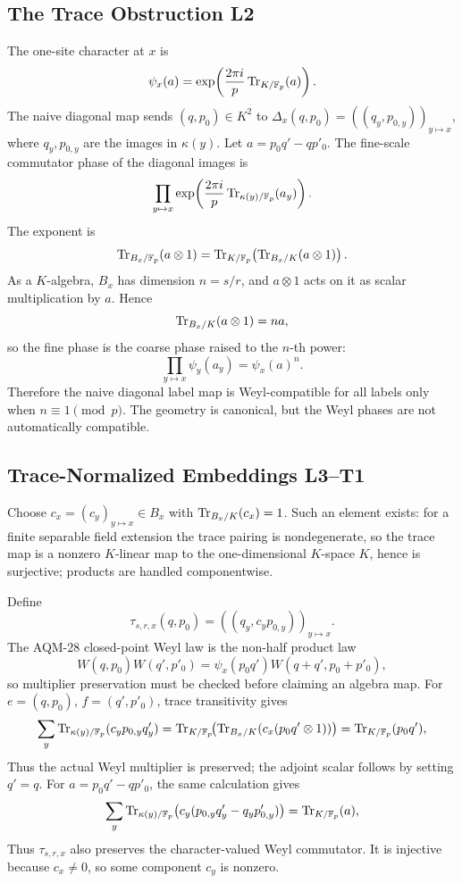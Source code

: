 \subsection{The Trace Obstruction L2}

The one-site character at \(x\) is
\[
  \psi_x(a)=\exp\!\left(\frac{2\pi i}{p}\operatorname{Tr}_{K/\mathbb F_p}(a)\right).
\]
The naive diagonal map sends \((q,p_0)\in K^2\) to
\(\Delta_x(q,p_0)=((q_y,p_{0,y}))_{y\mapsto x}\),
where \(q_y,p_{0,y}\) are the images in \(\kappa(y)\).  Let
\(a=p_0q'-q p'_0\).
The fine-scale commutator phase of the diagonal images is
\[
  \prod_{y\mapsto x}
  \exp\!\left(\frac{2\pi i}{p}
  \operatorname{Tr}_{\kappa(y)/\mathbb F_p}(a_y)\right).
\]
The exponent is
\[
  \operatorname{Tr}_{B_x/\mathbb F_p}(a\otimes1)
  =
  \operatorname{Tr}_{K/\mathbb F_p}\!\left(\operatorname{Tr}_{B_x/K}(a\otimes1)\right).
\]
As a \(K\)-algebra, \(B_x\) has dimension \(n=s/r\), and \(a\otimes1\) acts
on it as scalar multiplication by \(a\).  Hence
\[
  \operatorname{Tr}_{B_x/K}(a\otimes1)=n a,
\]
so the fine phase is the coarse phase raised to the \(n\)-th power:
\[
  \prod_{y\mapsto x}\psi_y(a_y)=\psi_x(a)^n .
\]
Therefore the naive diagonal label map is Weyl-compatible for all labels only
when \(n\equiv1\pmod p\).  The geometry is canonical, but the Weyl phases are
not automatically compatible.

\subsection{Trace-Normalized Embeddings L3--T1}

Choose \(c_x=(c_y)_{y\mapsto x}\in B_x\) with
\(\operatorname{Tr}_{B_x/K}(c_x)=1\).
Such an element exists: for a finite separable field extension the trace
pairing is nondegenerate, so the trace map is a nonzero \(K\)-linear map to
the one-dimensional \(K\)-space \(K\), hence is surjective; products are
handled componentwise.

Define
\[
  \tau_{s,r,x}(q,p_0)=((q_y,c_y p_{0,y}))_{y\mapsto x}.
\]
The AQM-28 closed-point Weyl law is the non-half product law
\[
  W(q,p_0)W(q',p'_0)=\psi_x(p_0q')W(q+q',p_0+p'_0),
\]
so multiplier preservation must be checked before claiming an algebra map.  For
\(e=(q,p_0)\), \(f=(q',p'_0)\), trace transitivity gives
\[
  \sum_y\operatorname{Tr}_{\kappa(y)/\mathbb F_p}(c_y p_{0,y}q'_y)=\operatorname{Tr}_{K/\mathbb F_p}\!\bigl(\operatorname{Tr}_{B_x/K}(c_x(p_0q'\otimes1))\bigr)=\operatorname{Tr}_{K/\mathbb F_p}(p_0q'),
\]
Thus the actual Weyl multiplier is preserved; the adjoint scalar follows by
setting \(q'=q\).  For \(a=p_0q'-q p'_0\), the same calculation gives
\[
  \sum_y\operatorname{Tr}_{\kappa(y)/\mathbb F_p}\bigl(c_y(p_{0,y}q'_y-q_y p'_{0,y})\bigr)=\operatorname{Tr}_{K/\mathbb F_p}(a),
\]
Thus \(\tau_{s,r,x}\) also preserves the character-valued Weyl commutator.  It is
injective because \(c_x\ne0\), so some component \(c_y\) is nonzero.

